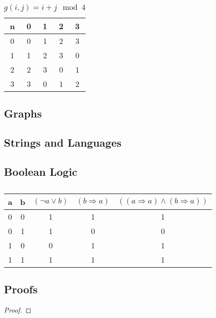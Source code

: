 \begin{table}[H]
    \centering
    \begin{tabular}{| c | c c c c|}
        \hline
        n & 0 & 1 & 2 & 3\\
        \hline
        0 & 0 & 1 & 2 & 3\\
        1 & 1 & 2 & 3 & 0\\
        2 & 2 & 3 & 0 & 1\\
        3 & 3 & 0 & 1 & 2\\
        \hline
    \end{tabular}
    \caption{$g(i, j) = i + j \mod 4$}
    \label{table:1}
\end{table}

\subsection{Graphs}

\subsection{Strings and Languages}

\subsection{Boolean Logic}

\begin{table}[H]
    \centering
    \begin{tabular}{| c c | c c c |}
        \hline
        a & b & $(\neg a \lor b)$ & $(b \Rightarrow a)$ & $((a \Rightarrow a) \land (b \Rightarrow a))$ \\
        \hline
        0 & 0 & 1 & 1 & 1\\
        0 & 1 & 1 & 0 & 0\\
        1 & 0 & 0 & 1 & 1\\
        1 & 1 & 1 & 1 & 1\\
        \hline
    \end{tabular}
    \caption{}
    \label{table:2}
\end{table}

\subsection{Proofs}

\begin{proof}
\end{proof}